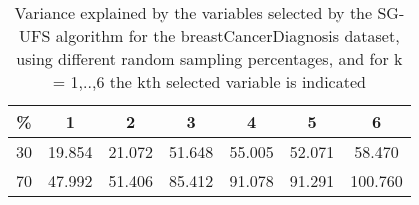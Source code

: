\begin{table}
	\begin{center}
		\begin{tabular}{c c c c c c c}
			\% & 1 & 2 & 3 & 4 & 5 & 6 \\
			\hline
			30 & 19.854 & 21.072 & 51.648 & 55.005 & 52.071 & 58.470 \\
			70 & 47.992 & 51.406 & 85.412 & 91.078 & 91.291 & 100.760 \\
		\end{tabular}
	\end{center}
	\caption{Variance explained by the variables selected by the SG-UFS algorithm for the breastCancerDiagnosis dataset, using different random sampling percentages, and for k = 1,..,6 the kth selected variable is indicated}
\end{table}